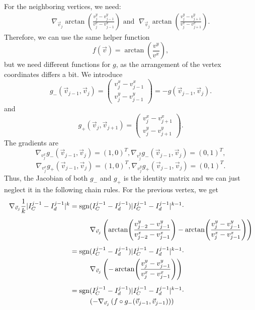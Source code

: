 \begin{proposition}
	For the neighboring vertices, we need:
	\begin{gather*}
		\nabla_{\vec{v}_j} \arctan\!\left( \frac{v_j^y - v_{j-1}^y}{v_j^x - v_{j-1}^x} \right) \text{ and  } \; \nabla_{\vec{v}_j} \arctan\!\left( \frac{v_j^y - v_{j+1}^y}{v_j^x - v_{j+1}^x} \right).
	\end{gather*}
	Therefore, we can use the same helper function \[f(\vec{v}) = \arctan\!\left( \frac{v^{y}}{v^{x}} \right),\]
	but we need different functions for $g$, as the arrangement of the vertex coordinates differs a bit. 
	We introduce \[g_{-}(\vec{v}_{j-1}, \vec{v}_{j}) = \begin{pmatrix}
		v_{j}^{x} - v_{j-1}^{x} \\[0.5em] 
		v_{j}^{y} - v_{j-1}^{y}
	\end{pmatrix} = - g(\vec{v}_{j-1}, \vec{v}_{j}).\] 
	and
	\[g_{+}(\vec{v}_{j}, \vec{v}_{j+1}) = \begin{pmatrix}
		v_{j}^{x} - v_{j+1}^{x} \\[0.5em] 
		v_{j}^{y} - v_{j+1}^{y}
	\end{pmatrix}.
	\] 
	The gradients are 
	\[
		\nabla_{v_j^x} g_{-}(\vec{v}_{j-1}, \vec{v}_{j}) = (1,0)^T, \nabla_{v_j^y} g_{-}(\vec{v}_{j-1}, \vec{v}_{j}) = (0,1)^T,
	\]
	\[
	\nabla_{v_j^x} g_{+}(\vec{v}_{j-1}, \vec{v}_{j}) = (1,0)^T, \nabla_{v_j^y} g_{+}(\vec{v}_{j-1}, \vec{v}_{j}) = (0,1)^T.
	\]
	Thus, the Jacobian of both $g_{-}$ and $g_{+}$ is the identity matrix and we can just neglect it in the following chain rules. 
	For the previous vertex, we get 
	\begin{align*}
		\nabla_{\vec{v}_j} \frac{1}{k}| I^{j-1}_{C} - I^{j-1}_d |^k 
		&= \sgn(I^{j-1}_{C} - I^{j-1}_d)|I^{j-1}_{C} - I^{j-1}_d|^{k-1} \cdot \\[0.5em]
		&\hspace{1cm} \nabla_{\vec{v}_j} \left(\arctan\!\left(\frac{v_{j-2}^{y} - v_{j-1}^{y}}{v_{j-2}^{x} - v_{j-1}^{x}}\right) - \arctan\!\left(\frac{v_{j}^{y} - v_{j-1}^{y}}{v_{j}^{x} - v_{j-1}^{x}}\right)\right) \\[0.5em]
		&= \sgn(I^{j-1}_{C} - I^{j-1}_d)|I^{j-1}_{C} - I^{j-1}_d|^{k-1} \cdot \\
		&\hspace{1cm} \nabla_{\vec{v}_j} \left(- \arctan\!\left(\frac{v_{j}^{y} - v_{j-1}^{y}}{v_{j}^{x} - v_{j-1}^{x}}\right)\right) \\[0.5em]
		&= \sgn(I^{j-1}_{C} - I^{j-1}_d)|I^{j-1}_{C} - I^{j-1}_d|^{k-1} \cdot \\
		&\hspace{1cm} (- \nabla_{\vec{v}_j} \left( f \circ g_{-}(\vec{v}_{j-1}, \vec{v}_{j-1}) \right)) \\[0.5em]

\end{align*}
\end{proposition}
